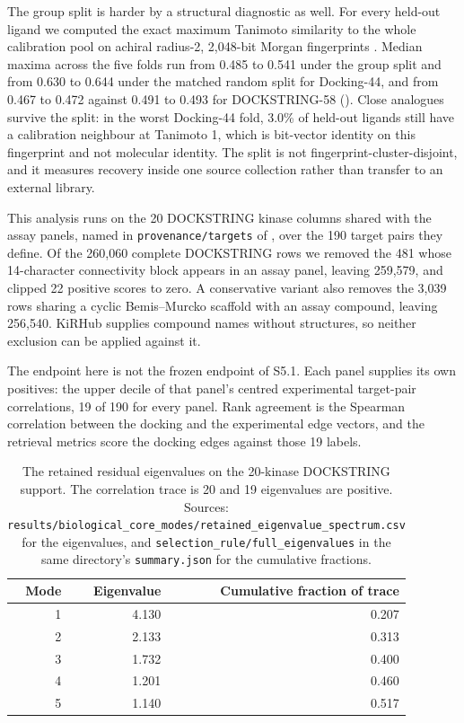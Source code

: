 The group split is harder by a structural diagnostic as well. For every held-out ligand we
computed the exact maximum Tanimoto similarity to the whole calibration pool on achiral
radius-2, 2{,}048-bit Morgan fingerprints \cite{morgan1965,rogers2010}. Median maxima across the
five folds run from 0.485 to 0.541 under the group split and from 0.630 to 0.644 under the
matched random split for Docking-44, and from 0.467 to 0.472 against 0.491 to 0.493 for
DOCKSTRING-58
().
Close analogues survive the split: in the worst Docking-44 fold, 3.0\% of held-out ligands still
have a calibration neighbour at Tanimoto 1, which is bit-vector identity on this fingerprint and
not molecular identity. The split is not fingerprint-cluster-disjoint, and it measures recovery
inside one source collection rather than transfer to an external library.


This analysis runs on the 20 DOCKSTRING kinase columns shared with the assay panels, named in
\texttt{provenance/targets} of , over the 190
target pairs they define. Of the 260{,}060 complete DOCKSTRING rows we removed the 481 whose
14-character connectivity block appears in an assay panel, leaving 259{,}579, and clipped 22
positive scores to zero. A conservative variant also removes the 3{,}039 rows sharing a cyclic
Bemis--Murcko scaffold with an assay compound, leaving 256{,}540. KiRHub supplies compound names
without structures, so neither exclusion can be applied against it.

The endpoint here is not the frozen endpoint of S5.1. Each panel supplies its own positives: the
upper decile of that panel's centred experimental target-pair correlations, 19 of 190 for every
panel. Rank agreement is the Spearman correlation between the docking and the experimental edge
vectors, and the retrieval metrics score the docking edges against those 19 labels.

\begin{table}[htbp]
\centering
\caption{The retained residual eigenvalues on the 20-kinase DOCKSTRING support. The correlation
trace is 20 and 19 eigenvalues are positive. Sources:
\texttt{results/biological\_core\_modes/retained\_eigenvalue\_spectrum.csv} for the eigenvalues,
and \texttt{selection\_rule/full\_eigenvalues} in the same directory's \texttt{summary.json} for
the cumulative fractions.}
\label{tab:s5spectrum}
\small
\begin{tabular}{rrr}
\toprule
Mode & Eigenvalue & Cumulative fraction of trace \\
\midrule
1 & 4.130 & 0.207 \\
2 & 2.133 & 0.313 \\
3 & 1.732 & 0.400 \\
4 & 1.201 & 0.460 \\
5 & 1.140 & 0.517 \\
\bottomrule
\end{tabular}
\end{table}

